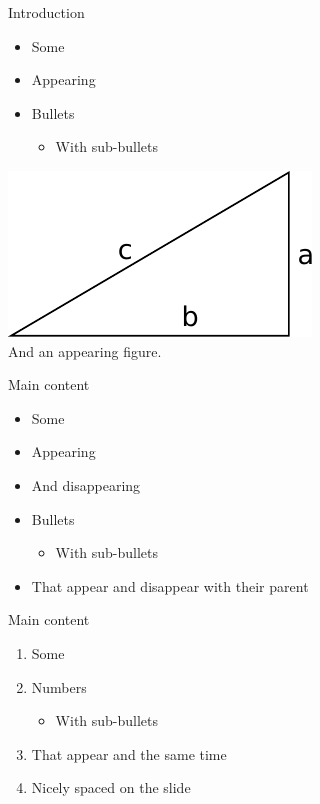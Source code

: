 \documentclass{thesisbeamer}
\begin{document}
\begin{frame}{Introduction}
\begin{itemize}[<+->]
\item Some
\item Appearing
\item Bullets
\begin{itemize}
 \item With sub-bullets
\end{itemize}
\end{itemize} 
 \visible<+-> {
 \begin{center}
  \includegraphics[width=.4\linewidth]{triangle1} \\
  And an appearing figure.
 \end{center}
 }
\end{frame}


\begin{frame}{Main content}
\begin{itemize}[<+>]
\item Some
\item Appearing
  \item And disappearing
\item Bullets
\begin{itemize}[<.>]
 \item With sub-bullets
\end{itemize}
\item That appear and disappear with their parent
\end{itemize}
\end{frame}



\begin{frame}{Main content}
\begin{enumerate}
\item Some	\vfill
\item Numbers
\begin{itemize}
 \item With sub-bullets
\end{itemize}\vfill
\item That appear and the same time\vfill
\item Nicely spaced on the slide
\end{enumerate}
\end{frame}
\end{document}
